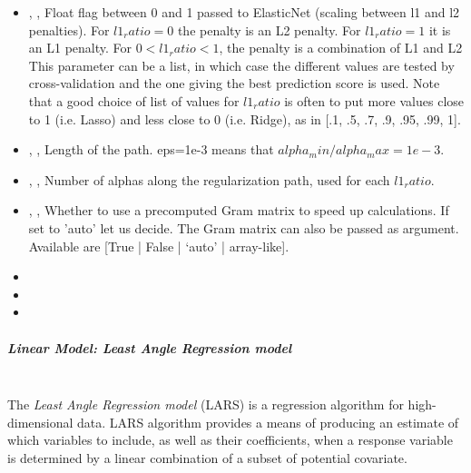 \begin{itemize}
  \item {} , ,
  Float flag between 0 and 1 passed to ElasticNet (scaling between l1 and l2
  penalties).
  For $l1_ratio = 0$ the penalty is an L2 penalty.
  For $l1_ratio = 1$ it is an L1 penalty.
  For $0 < l1_ratio < 1$, the penalty is a combination of L1 and L2 This
  parameter can be a list, in which case the different values are tested by
  cross-validation and the one giving the best prediction score is used.
  Note that a good choice of list of values for $l1_ratio$ is often to put more
  values close to 1 (i.e. Lasso) and less close to 0 (i.e. Ridge), as in [.1,
  .5, .7, .9, .95, .99, 1].
  \item {} , ,
  Length of the path.
  eps=1e-3 means that $alpha_min / alpha_max = 1e-3$.
  \item {} , ,
  Number of alphas along the regularization path, used for each $l1_ratio$.
  \item {} , ,
  Whether to use a precomputed Gram matrix to speed up calculations.
  If set to 'auto' let us decide.
  The Gram matrix can also be passed as argument.
  Available are [True | False | ‘auto’ | array-like].
  \item {}
  \item {}
  \item {}
\end{itemize}
\subparagraph{Linear Model: Least Angle Regression model}
\mbox{}
\\The \textit{Least Angle Regression model} (LARS) is a regression algorithm for
high-dimensional data.
%
LARS algorithm provides a means of producing an estimate of which variables to
include, as well as their coefficients, when a response variable is determined
by a linear combination of a subset of potential covariate.
%

